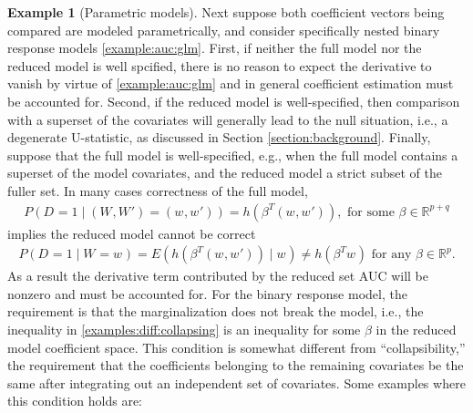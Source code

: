 \documentclass[12pt]{article}
\newcommand{\E}{E}
\renewcommand{\P}{P}
\newcommand{\W}[1][]{W_{#1}}
\newcommand{\w}[1][]{w_{#1}}
\newcommand{\D}[1][]{D_{#1}}
\renewcommand{\t}[1]{{#1}^T}
\newcommand{\h}{h}
\theoremstyle{definition}
\newtheorem{example}{Example}%
\newcommand{\comment}[1]{
  \iftoggle{commenttoggle}{
    {\normalsize{\color{red}{ #1}}\normalsize}
  }
  {}
}
\begin{document}
\begin{example}[Parametric models]\label{example:diff:parametric} Next suppose both coefficient vectors being compared are modeled
  parametrically, and consider specifically nested binary response
  models \ref{example:auc:glm}.  First, if neither the full model nor the
  reduced model is well spcified, there is no reason to expect the
  derivative to vanish by virtue of \ref{example:auc:glm}
  and in general coefficient estimation must be accounted for. Second,
  if the reduced model is well-specified, then comparison with a
  superset of the covariates will generally lead to the null
  situation, i.e., a degenerate U-statistic, as discussed in Section \ref{section:background}.
Finally, suppose that the full model is well-specified, e.g., when the full
model contains a superset of the model covariates, and the reduced
model a strict subset of the fuller set. \comment{give citations to
simulations/data anlayses} In many cases correctness of the full
model,
\begin{align}
    \P(\D=1\mid(\W,\W')=(\w,\w')) = \h(\t\beta (\w,\w')), \text{ for some }\beta\in\mathbb{R}^{p+q}\label{defn:binary response}
\end{align}
implies the reduced model cannot be correct
\begin{align}
  \P(\D=1\mid \W=\w)=\E(\h(\t\beta (\w,\w'))\mid \w)\neq \h(\t\beta \w) \text{ for any }\beta\in\mathbb{R}^p.\label{examples:diff:collapsing}
\end{align}
As a result the derivative term contributed by the reduced set AUC will be nonzero and must be
accounted for.
For the binary response model, the requirement is that the
marginalization does not break the model, i.e., the inequality in
\ref{examples:diff:collapsing} is an inequality for some $\beta$ in
the reduced model coefficient space. This condition is somewhat
different from ``collapsibility,'' the requirement that the
coefficients belonging to the remaining covariates be the same after
integrating out an independent set of covariates.  Some examples where
this condition holds are:


\end{example}
\end{document}
